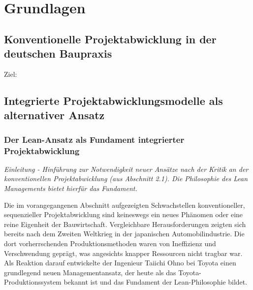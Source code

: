 \chapter{Grundlagen}
\label{ch:grundlagen}

\section{Konventionelle Projektabwicklung in der deutschen Baupraxis}
\label{sec: 2.1}
Ziel:

\clearpage

\section{Integrierte Projektabwicklungsmodelle als alternativer Ansatz}
\label{sec: 2.2}


\subsection{Der Lean-Ansatz als Fundament integrierter Projektabwicklung}
\label{sec:2.2.1}


\textit{Einleitung - Hinführung zur Notwendigkeit neuer Ansätze nach der Kritik an der konventionellen Projektabwicklung (aus Abschnitt 2.1). Die Philosophie des Lean Managements bietet hierfür das Fundament.}

Die im vorangegangenen Abschnitt aufgezeigten Schwachstellen konventioneller, sequenzieller Projektabwicklung sind keineswegs ein neues Phänomen oder eine reine Eigenheit der Bauwirtschaft. Vergleichbare Herausforderungen zeigten sich bereits nach dem Zweiten Weltkrieg in der japanischen Automobilindustrie. Die dort vorherrschenden Produktionsmethoden waren von Ineffizienz und Verschwendung geprägt, was angesichts knapper Ressourcen nicht tragbar war. Als Reaktion darauf entwickelte der Ingenieur Taiichi Ohno bei Toyota einen grundlegend neuen Managementansatz, der heute als das Toyota-Produktionssystem bekannt ist und das Fundament der Lean-Philosophie bildet.

